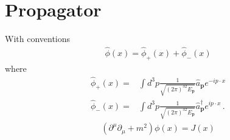 \section{Propagator}
With conventions
\begin{align}
  \widehat{\phi}(x)=\widehat{\phi}_+(x)+\widehat{\phi}_-(x)
\end{align}
where
\begin{align}
  \widehat{\phi}_+(x)=&\int d^3p \frac{1}{\sqrt{(2\pi)^32E_\mathbf{p} }}
  \widehat{a}_\mathbf{p} e^{-i p\cdot x }\nonumber\\
  \widehat{\phi}_-(x)=&\int d^3p \frac{1}{\sqrt{(2\pi)^32E_\mathbf{p} }}\widehat{a}_\mathbf{p}^\dagger e^{i p\cdot x }\,.
\end{align}
\begin{align*}
  \left( \partial^{\mu}\partial_{\mu}+m^2 \right)\phi(x)=J(x)
\end{align*}
